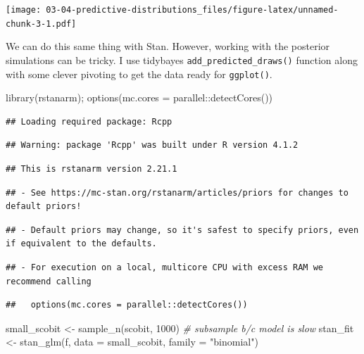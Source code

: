 \documentclass[
]{book}
\newenvironment{Shaded}{\begin{snugshade}}{\end{snugshade}}
\newcommand{\AttributeTok}[1]{\textcolor[rgb]{0.77,0.63,0.00}{#1}}
\newcommand{\CommentTok}[1]{\textcolor[rgb]{0.56,0.35,0.01}{\textit{#1}}}
\newcommand{\DecValTok}[1]{\textcolor[rgb]{0.00,0.00,0.81}{#1}}
\newcommand{\FunctionTok}[1]{\textcolor[rgb]{0.00,0.00,0.00}{#1}}
\newcommand{\NormalTok}[1]{#1}
\newcommand{\OtherTok}[1]{\textcolor[rgb]{0.56,0.35,0.01}{#1}}
\newcommand{\SpecialCharTok}[1]{\textcolor[rgb]{0.00,0.00,0.00}{#1}}
\newcommand{\StringTok}[1]{\textcolor[rgb]{0.31,0.60,0.02}{#1}}
\begin{document}
\texttt{[image: 03-04-predictive-distributions\_files/figure-latex/unnamed-chunk-3-1.pdf]}

We can do this same thing with Stan. However, working with the posterior
simulations can be tricky. I use tidybayes
\texttt{add\_predicted\_draws()} function along with some clever
pivoting to get the data ready for \texttt{ggplot()}.

\begin{Shaded}
\begin{Highlighting}[]
\FunctionTok{library}\NormalTok{(rstanarm); }\FunctionTok{options}\NormalTok{(}\AttributeTok{mc.cores =}\NormalTok{ parallel}\SpecialCharTok{::}\FunctionTok{detectCores}\NormalTok{())}
\end{Highlighting}
\end{Shaded}

\begin{verbatim}
## Loading required package: Rcpp
\end{verbatim}

\begin{verbatim}
## Warning: package 'Rcpp' was built under R version 4.1.2
\end{verbatim}

\begin{verbatim}
## This is rstanarm version 2.21.1
\end{verbatim}

\begin{verbatim}
## - See https://mc-stan.org/rstanarm/articles/priors for changes to default priors!
\end{verbatim}

\begin{verbatim}
## - Default priors may change, so it's safest to specify priors, even if equivalent to the defaults.
\end{verbatim}

\begin{verbatim}
## - For execution on a local, multicore CPU with excess RAM we recommend calling
\end{verbatim}

\begin{verbatim}
##   options(mc.cores = parallel::detectCores())
\end{verbatim}

\begin{Shaded}
\begin{Highlighting}[]
\NormalTok{small\_scobit }\OtherTok{\textless{}{-}} \FunctionTok{sample\_n}\NormalTok{(scobit, }\DecValTok{1000}\NormalTok{)  }\CommentTok{\# subsample b/c model is slow}
\NormalTok{stan\_fit }\OtherTok{\textless{}{-}} \FunctionTok{stan\_glm}\NormalTok{(f, }\AttributeTok{data =}\NormalTok{ small\_scobit, }\AttributeTok{family =} \StringTok{"binomial"}\NormalTok{)}
\end{Highlighting}
\end{Shaded}
\end{document}
